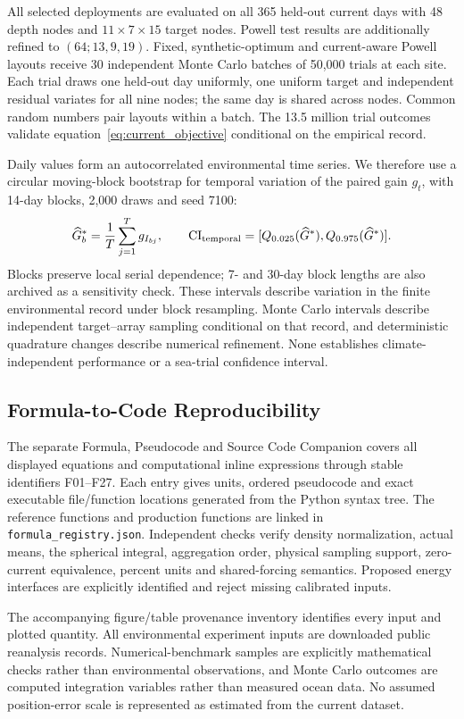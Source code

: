 \documentclass[fleqn,10pt]{wlscirep}
\begin{document}
All selected deployments are evaluated on all 365 held-out current days with 48 depth nodes and $11\times7\times15$ target nodes. Powell test results are additionally refined to $(64;13,9,19)$. Fixed, synthetic-optimum and current-aware Powell layouts receive 30 independent Monte Carlo batches of 50,000 trials at each site. Each trial draws one held-out day uniformly, one uniform target and independent residual variates for all nine nodes; the same day is shared across nodes. Common random numbers pair layouts within a batch. The 13.5 million trial outcomes validate equation~\eqref{eq:current_objective} conditional on the empirical record.

Daily values form an autocorrelated environmental time series. We therefore use a circular moving-block bootstrap for temporal variation of the paired gain $g_t$, with 14-day blocks, 2,000 draws and seed 7100:
\begin{equation}\label{eq:temporal_bootstrap}
\widehat G_b^*=\frac1T\sum_{j=1}^{T}g_{I_{bj}},\qquad
\mathrm{CI}_{\rm temporal}=[Q_{0.025}(\widehat G^*),Q_{0.975}(\widehat G^*)].
\end{equation}
Blocks preserve local serial dependence; 7- and 30-day block lengths are also archived as a sensitivity check. These intervals describe variation in the finite environmental record under block resampling. Monte Carlo intervals describe independent target--array sampling conditional on that record, and deterministic quadrature changes describe numerical refinement. None establishes climate-independent performance or a sea-trial confidence interval.

\subsection*{Formula-to-Code Reproducibility}
The separate Formula, Pseudocode and Source Code Companion covers all displayed equations and computational inline expressions through stable identifiers F01--F27. Each entry gives units, ordered pseudocode and exact executable file/function locations generated from the Python syntax tree. The reference functions and production functions are linked in \texttt{formula\_registry.json}. Independent checks verify density normalization, actual means, the spherical integral, aggregation order, physical sampling support, zero-current equivalence, percent units and shared-forcing semantics. Proposed energy interfaces are explicitly identified and reject missing calibrated inputs.

The accompanying figure/table provenance inventory identifies every input and plotted quantity. All environmental experiment inputs are downloaded public reanalysis records. Numerical-benchmark samples are explicitly mathematical checks rather than environmental observations, and Monte Carlo outcomes are computed integration variables rather than measured ocean data. No assumed position-error scale is represented as estimated from the current dataset.
\end{document}
